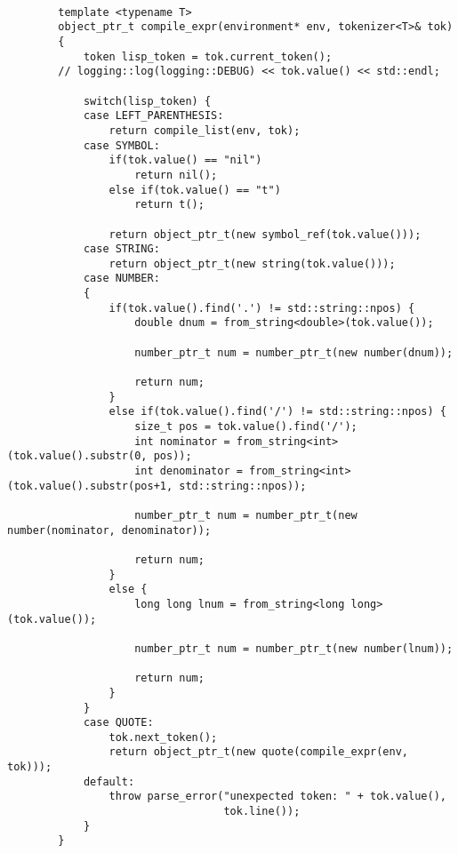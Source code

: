 \begin{lstlisting}[caption={Interpreter}, label=lst:interpreter]

        template <typename T>
        object_ptr_t compile_expr(environment* env, tokenizer<T>& tok)
        {
            token lisp_token = tok.current_token();
	    // logging::log(logging::DEBUG) << tok.value() << std::endl;

            switch(lisp_token) {
            case LEFT_PARENTHESIS:
                return compile_list(env, tok);
            case SYMBOL:
                if(tok.value() == "nil")
                    return nil();
                else if(tok.value() == "t")
                    return t();

                return object_ptr_t(new symbol_ref(tok.value()));
            case STRING:
                return object_ptr_t(new string(tok.value()));
            case NUMBER:
            {
                if(tok.value().find('.') != std::string::npos) {
                    double dnum = from_string<double>(tok.value());

                    number_ptr_t num = number_ptr_t(new number(dnum));

                    return num;
                }
                else if(tok.value().find('/') != std::string::npos) {
                    size_t pos = tok.value().find('/');
                    int nominator = from_string<int>(tok.value().substr(0, pos));
                    int denominator = from_string<int>(tok.value().substr(pos+1, std::string::npos));

                    number_ptr_t num = number_ptr_t(new number(nominator, denominator));

                    return num;
                }
                else {
                    long long lnum = from_string<long long>(tok.value());

                    number_ptr_t num = number_ptr_t(new number(lnum));

                    return num;
                }
            }
            case QUOTE:
                tok.next_token();
                return object_ptr_t(new quote(compile_expr(env, tok)));
            default:
                throw parse_error("unexpected token: " + tok.value(),
                                  tok.line());
            }
        }

\end{lstlisting}
